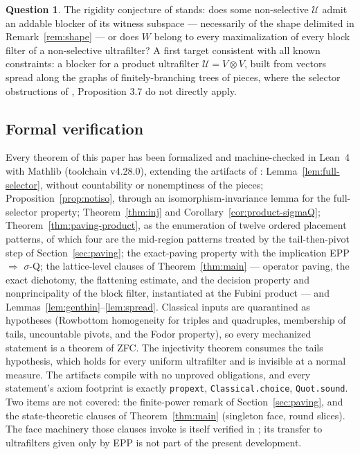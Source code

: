 \documentclass[11pt]{article}
\theoremstyle{definition}
\newtheorem{question}[theorem]{Question}
\newcommand{\U}{\mathcal{U}}
\begin{document}
\begin{question}\label{q:rigidity}
The rigidity conjecture of \cite{FWII} stands: does some non-selective
$\U$ admit an addable blocker of its witness subspace --- necessarily of
the shape delimited in Remark~\ref{rem:shape} --- or does $W$ belong to
every maximalization of every block filter of a non-selective
ultrafilter? A first target consistent with all known constraints: a
blocker for a product ultrafilter $\U=V\otimes V$, built from vectors
spread along the graphs of finitely-branching trees of pieces, where the
selector obstructions of \cite{FWII}, Proposition 3.7 do not directly
apply.
\end{question}

\subsection*{Formal verification}

Every theorem of this paper has been formalized and machine-checked in
Lean~4 with Mathlib (toolchain v4.28.0), extending the artifacts of
\cite{FWIII}: Lemma~\ref{lem:full-selector}, without countability or
nonemptiness of the pieces; Proposition~\ref{prop:notiso}, through an
isomorphism-invariance lemma for the full-selector property;
Theorem~\ref{thm:inj} and Corollary~\ref{cor:product-sigmaQ};
Theorem~\ref{thm:paving-product}, as the enumeration of twelve ordered
placement patterns, of which four are the mid-region patterns treated by the
tail-then-pivot step of Section~\ref{sec:paving}; the exact-paving property
with the implication EPP $\Rightarrow$ $\sigma$-Q; the lattice-level clauses
of Theorem~\ref{thm:main} --- operator paving, the exact dichotomy, the
flattening estimate, and the decision property and nonprincipality of the
block filter, instantiated at the Fubini product --- and
Lemmas~\ref{lem:genthin}--\ref{lem:spread}. Classical inputs are
quarantined as hypotheses (Rowbottom homogeneity for triples and
quadruples, membership of tails, uncountable pivots, and the Fodor
property), so every mechanized statement is a theorem of ZFC. The
injectivity theorem consumes the tails hypothesis, which holds for every
uniform ultrafilter and is invisible at a normal measure. The artifacts
compile with no unproved obligations, and every statement's axiom footprint
is exactly \texttt{propext}, \texttt{Classical.choice},
\texttt{Quot.sound}. Two items are not covered: the finite-power remark of
Section~\ref{sec:paving}, and the state-theoretic clauses of
Theorem~\ref{thm:main} (singleton face, round slices). The face machinery
those clauses invoke is itself verified in \cite{FWI}; its transfer to
ultrafilters given only by EPP is not part of the present development.
\end{document}
